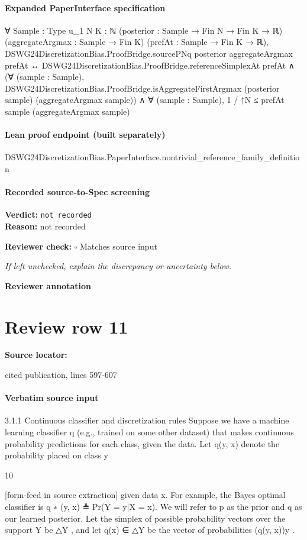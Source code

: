 \documentclass[10pt]{article}
\newcommand{\reviewerbox}{%
  \par\noindent\fbox{\parbox{0.96\linewidth}{\rule{0pt}{0.38in}}}\par
}
\newcommand{\reviewmatch}[1]{%
  \par\noindent\textbf{Reviewer check:} $\square$\; #1\par
  \noindent\emph{If left unchecked, explain the discrepancy or uncertainty below.}\par
}
\begin{document}
\paragraph{Expanded PaperInterface specification}
\begin{ReviewVerbatim}
∀ {Sample : Type u_1} {N K : ℕ} (posterior : Sample → Fin N → Fin K → ℝ) (aggregateArgmax : Sample → Fin K)
  (prefAt : Sample → Fin K → ℝ),
  DSWG24DiscretizationBias.ProofBridge.sourcePNq posterior aggregateArgmax prefAt ↔
    DSWG24DiscretizationBias.ProofBridge.referenceSimplexAt prefAt ∧
      (∀ (sample : Sample),
          DSWG24DiscretizationBias.ProofBridge.isAggregateFirstArgmax (posterior sample) (aggregateArgmax sample)) ∧
        ∀ (sample : Sample), 1 / ↑N ≤ prefAt sample (aggregateArgmax sample)
\end{ReviewVerbatim}

\paragraph{Lean proof endpoint (built separately)}\begin{ReviewVerbatim}
DSWG24DiscretizationBias.PaperInterface.nontrivial_reference_family_definition
\end{ReviewVerbatim}

\paragraph{Recorded source-to-Spec screening}
\textbf{Verdict:} \texttt{not recorded}
\\
\textbf{Reason:} not recorded
\reviewmatch{Matches source input}
\noindent\textbf{Reviewer annotation}\par
\reviewerbox
\clearpage
\hypertarget{source-claim-d69492a6cc9555ec}{}
\section*{Review row 11}
\textbf{Source locator:} {\footnotesize\raggedright cited publication, lines 597-\allowbreak{}607\par}
\paragraph{Verbatim source input}
\begin{ReviewVerbatim}
3.1.1    Continuous classifier and discretization rules
Suppose we have a machine learning classifier q (e.g., trained on some other dataset) that makes continuous
probability predictions for each class, given the data. Let q(y, x) denote the probability placed on class y



                                                       10

[form-feed in source extraction]
given data x. For example, the Bayes optimal classifier is
                                               q ∗ (y, x) ≜ Pr(Y = y|X = x).
We will refer to p as the prior and q as our learned posterior. Let the simplex of possible probability vectors
over the support Y be △Y , and let q(x) ∈ △Y be the vector of probabilities (q(y, x))y .
\end{ReviewVerbatim}
\end{document}
